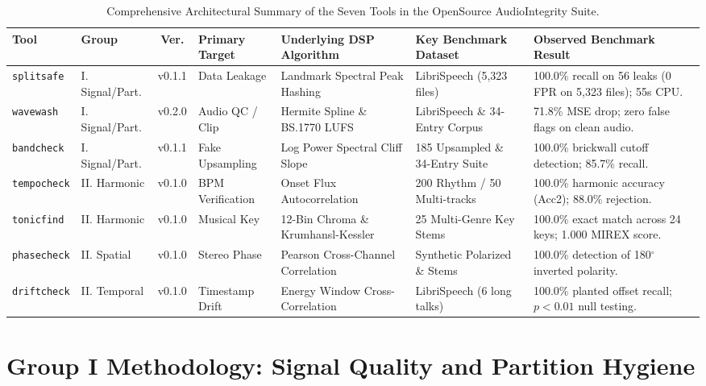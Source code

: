 \documentclass[10pt,journal,compsoc]{IEEEtran}
\begin{document}
\begin{table}[t]
\centering
\caption{Comprehensive Architectural Summary of the Seven Tools in the OpenSource AudioIntegrity Suite.}
\label{tab:suite_summary}
\footnotesize
\renewcommand{\arraystretch}{1.15}
\setlength{\tabcolsep}{3.5pt}
\begin{tabular}{@{}llclp{3.6cm}p{2.6cm}p{4.3cm}@{}}
\toprule
\textbf{Tool} & \textbf{Group} & \textbf{Ver.} & \textbf{Primary Target} & \textbf{Underlying DSP Algorithm} & \textbf{Key Benchmark Dataset} & \textbf{Observed Benchmark Result} \\
\midrule
\texttt{splitsafe} & I. Signal/Part. & v0.1.1 & Data Leakage & Landmark Spectral Peak Hashing & LibriSpeech (5,323 files) & 100.0\% recall on 56 leaks (0 FPR on 5,323 files); 55s CPU. \\
\texttt{wavewash} & I. Signal/Part. & v0.2.0 & Audio QC / Clip & Hermite Spline \& BS.1770 LUFS & LibriSpeech \& 34-Entry Corpus & 71.8\% MSE drop; zero false flags on clean audio. \\
\texttt{bandcheck} & I. Signal/Part. & v0.1.1 & Fake Upsampling & Log Power Spectral Cliff Slope & 185 Upsampled \& 34-Entry Suite & 100.0\% brickwall cutoff detection; 85.7\% recall. \\
\midrule
\texttt{tempocheck} & II. Harmonic & v0.1.0 & BPM Verification & Onset Flux Autocorrelation & 200 Rhythm / 50 Multi-tracks & 100.0\% harmonic accuracy (Acc2); 88.0\% rejection. \\
\texttt{tonicfind} & II. Harmonic & v0.1.0 & Musical Key & 12-Bin Chroma \& Krumhansl-Kessler & 25 Multi-Genre Key Stems & 100.0\% exact match across 24 keys; 1.000 MIREX score. \\
\texttt{phasecheck} & II. Spatial & v0.1.0 & Stereo Phase & Pearson Cross-Channel Correlation & Synthetic Polarized \& Stems & 100.0\% detection of 180$^\circ$ inverted polarity. \\
\texttt{driftcheck} & II. Temporal & v0.1.0 & Timestamp Drift & Energy Window Cross-Correlation & LibriSpeech (6 long talks) & 100.0\% planted offset recall; $p < 0.01$ null testing. \\
\bottomrule
\end{tabular}
\end{table}

\section{Group I Methodology: Signal Quality and Partition Hygiene}
\end{document}
